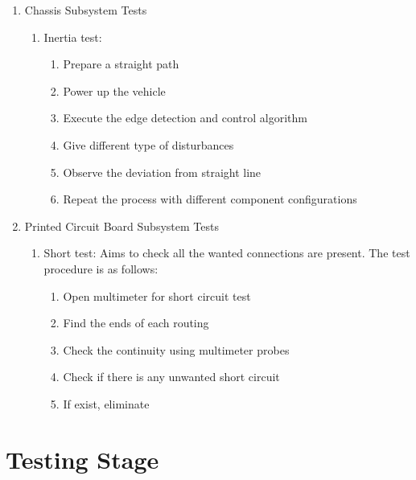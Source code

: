 \documentclass[a4paper,12pt]{article}
\begin{document}
\begin{enumerate}
		
		
		
			
		
		
	
	\item {Chassis Subsystem Tests}
	\begin{enumerate}
		\item Inertia test: 
		\begin{enumerate}
		\item Prepare a straight path
		\item Power up the vehicle 
		\item Execute the edge detection and control algorithm
		\item Give different type of disturbances 
		\item Observe the deviation from straight line
		\item Repeat the process with different component configurations
		\end{enumerate} 
	\end{enumerate}
	
	
	
	

	
	\item {Printed Circuit Board Subsystem Tests}
	
	\begin{enumerate}
		\item Short test: Aims to check all the wanted connections are present. The test procedure is as follows:
		\begin{enumerate} 
			\item Open multimeter for short circuit test  
			\item Find the ends of each routing 
			\item Check the continuity using multimeter probes
			\item Check if there is any unwanted short circuit
			\item If exist, eliminate
		\end{enumerate}
	\end{enumerate}
	
	
	
	\end{enumerate}
		
	
	
	\section{Testing Stage}
	
\end{document}
